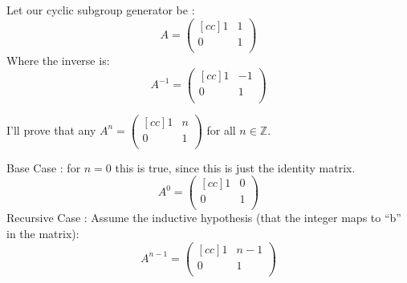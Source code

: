\begin{enumerate}
\begin{enumerate}
  Let our cyclic subgroup generator be : 
$$
A = 
  \begin{pmatrix}[cc]
    1 & 1 \\
    0 & 1 \\
  \end{pmatrix}
$$
Where the inverse is:
$$
A^{-1} = 
  \begin{pmatrix}[cc]
    1 & -1 \\
    0 & 1 \\
  \end{pmatrix}
$$

I'll prove that any $A^n =   
  \begin{pmatrix}[cc]
    1 & n \\
    0 & 1 \\
  \end{pmatrix}$ for all $n \in \mathds{Z}$.

Base Case : for $n=0$ this is true, since this is just the identity matrix.
$$
A^0 = 
  \begin{pmatrix}[cc]
    1 & 0 \\
    0 & 1 \\
  \end{pmatrix}
$$
Recursive Case : Assume the inductive hypothesis (that the integer maps to ``b'' in the matrix):
$$
A^{n-1} = 
  \begin{pmatrix}[cc]
    1 & n-1 \\
    0 & 1 \\
  \end{pmatrix}
$$


\end{enumerate}
\end{enumerate}
